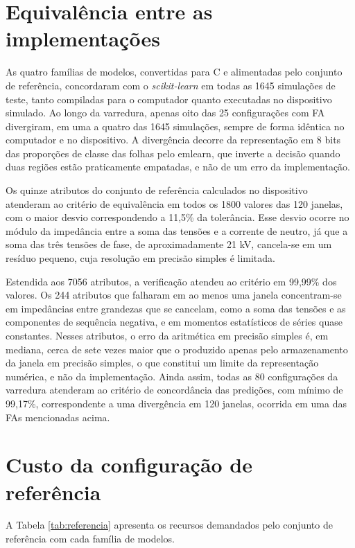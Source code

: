 \documentclass[
	12pt,				%
	openright,			%
	oneside,			%
	a4paper,			%
	english,			%
	brazil,				%
	]{abntex2}
\begin{document}
\section{Equivalência entre as implementações}
As quatro famílias de modelos, convertidas para C e alimentadas pelo conjunto de referência, concordaram com o \textit{scikit-learn} em todas as 1645 simulações de teste, tanto compiladas para o computador quanto executadas no dispositivo simulado. Ao longo da varredura, apenas oito das 25 configurações com FA divergiram, em uma a quatro das 1645 simulações, sempre de forma idêntica no computador e no dispositivo. A divergência decorre da representação em 8 bits das proporções de classe das folhas pelo emlearn, que inverte a decisão quando duas regiões estão praticamente empatadas, e não de um erro da implementação.

Os quinze atributos do conjunto de referência calculados no dispositivo atenderam ao critério de equivalência em todos os 1800 valores das 120 janelas, com o maior desvio correspondendo a 11,5\% da tolerância. Esse desvio ocorre no módulo da impedância entre a soma das tensões e a corrente de neutro, já que a soma das três tensões de fase, de aproximadamente 21 kV, cancela-se em um resíduo pequeno, cuja resolução em precisão simples é limitada.

Estendida aos 7056 atributos, a verificação atendeu ao critério em 99,99\% dos valores. Os 244 atributos que falharam em ao menos uma janela concentram-se em impedâncias entre grandezas que se cancelam, como a soma das tensões e as componentes de sequência negativa, e em momentos estatísticos de séries quase constantes. Nesses atributos, o erro da aritmética em precisão simples é, em mediana, cerca de sete vezes maior que o produzido apenas pelo armazenamento da janela em precisão simples, o que constitui um limite da representação numérica, e não da implementação. Ainda assim, todas as 80 configurações da varredura atenderam ao critério de concordância das predições, com mínimo de 99,17\%, correspondente a uma divergência em 120 janelas, ocorrida em uma das FAs mencionadas acima.

\section{Custo da configuração de referência}
A Tabela \ref{tab:referencia} apresenta os recursos demandados pelo conjunto de referência com cada família de modelos.
\end{document}
